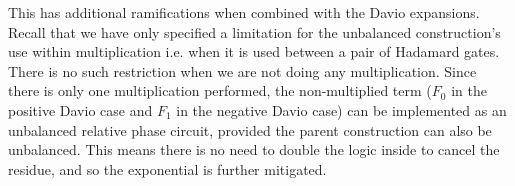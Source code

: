 This has additional ramifications when combined with the Davio expansions. Recall that we have only specified a limitation for
the unbalanced construction's use within multiplication i.e. when it is used between a pair of Hadamard gates. There is no such
restriction when we are not doing any multiplication. Since there is only one multiplication performed, the non-multiplied term
($F_0$ in the positive Davio case and $F_1$ in the negative Davio case) can be implemented as an unbalanced relative phase circuit,
provided the parent construction can also be unbalanced. This means there is no need to double the logic inside to cancel the residue,
and so the exponential is further mitigated. 




